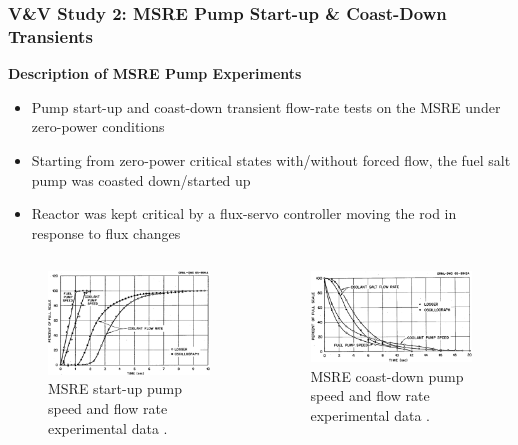 \begin{frame}
  \frametitle{V\&V Study 2: MSRE Pump Start-up \& Coast-Down Transients}
  \textbf{Description of MSRE Pump Experiments}
  \begin{itemize}
    \item Pump start-up and coast-down transient flow-rate tests on the MSRE under zero-power
  conditions
    \item Starting from zero-power critical states with/without forced flow, the fuel salt pump
  was coasted down/started up
    \item Reactor was kept critical by a flux-servo controller moving the rod in response to flux
      changes
  \end{itemize}
  \begin{columns}
    \column[t]{5.5cm}
    \begin{figure}
      \centering
      \includegraphics[width=.8\columnwidth]{images/msre-startup}
      \caption{MSRE start-up pump speed and flow rate experimental data
      \cite{prince_zero-power_1968}.}
    \end{figure}
    \column[t]{5.5cm}
    \begin{figure}
      \centering
      \includegraphics[width=.95\columnwidth]{images/msre-coastdown}
      \caption{MSRE coast-down pump speed and flow rate experimental data
      \cite{prince_zero-power_1968}.}
    \end{figure}
  \end{columns}
\end{frame}

